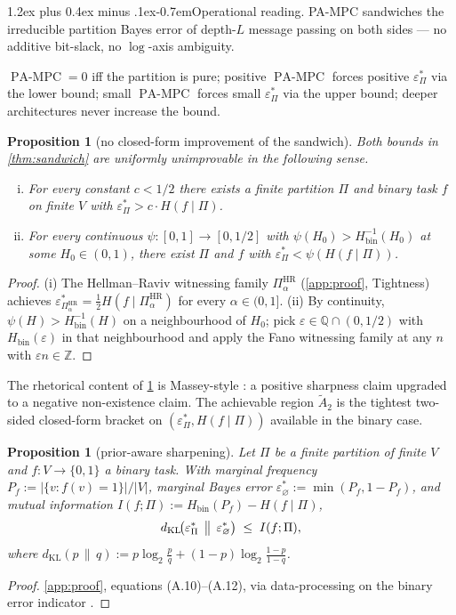 \documentclass[10pt]{article}
\makeatletter
\def\paragraph{\@startsection{paragraph}{4}{\z@}%
  {1.2ex plus 0.4ex minus .1ex}{-0.7em}{\normalsize\bf}}
\newtheorem{proposition}[theorem]{Proposition}
\theoremstyle{definition}
\theoremstyle{remark}
\newcommand{\Hbin}{H_{\mathrm{bin}}}
\newcommand{\eps}{\varepsilon}
\newcommand{\epsP}{\eps^{*}_{\Pi}}
\newcommand{\epsE}{\eps^{*}_{\varnothing}}
\newcommand{\PAMPC}{\operatorname{PA\text{-}MPC}}
\newcommand{\dKL}{d_{\mathrm{KL}}}
\makeatother
\begin{document}
\paragraph{Operational reading.}
PA-MPC sandwiches the irreducible partition Bayes error of depth-$L$
message passing on both sides --- no additive bit-slack, no
$\log$-axis ambiguity.

$\PAMPC = 0$ iff the partition is pure; positive $\PAMPC$ forces
positive $\epsP$ via the lower bound; small $\PAMPC$ forces small
$\epsP$ via the upper bound; deeper architectures never increase the
bound.

\begin{proposition}[no closed-form improvement of the sandwich]\label{prop:sharp}
Both bounds in \cref{thm:sandwich} are uniformly unimprovable in the
following sense.
\begin{enumerate}[(i)]
  \item For every constant $c < 1/2$ there exists a finite partition
    $\Pi$ and binary task $f$ on finite $V$ with
    $\epsP > c \cdot H(f \mid \Pi)$.
  \item For every \emph{continuous} $\psi : [0,1] \to [0, 1/2]$
    with $\psi(H_0) > \Hbin^{-1}(H_0)$ at some $H_0 \in (0, 1)$,
    there exist $\Pi$ and $f$ with $\epsP < \psi(H(f \mid \Pi))$.
\end{enumerate}
\end{proposition}
\begin{proof}
(i) The Hellman--Raviv witnessing family $\Pi_\alpha^{\mathrm{HR}}$
(\cref{app:proof}, Tightness) achieves
$\eps^{*}_{\Pi_\alpha^{\mathrm{HR}}} = \tfrac{1}{2} H(f \mid \Pi_\alpha^{\mathrm{HR}})$
for every $\alpha \in (0,1]$.
(ii) By continuity, $\psi(H) > \Hbin^{-1}(H)$ on a neighbourhood of
$H_0$; pick $\eps \in \mathbb{Q} \cap (0, 1/2)$ with $\Hbin(\eps)$ in
that neighbourhood and apply the Fano witnessing family at any $n$
with $\eps n \in \mathbb{Z}$.
\end{proof}

The rhetorical content of \cref{prop:sharp} is
Massey-style \citep[\S III]{massey1994}: a positive sharpness claim
upgraded to a negative non-existence claim. The achievable region
$\widetilde{A}_2$ is the tightest two-sided closed-form bracket on
$(\epsP, H(f \mid \Pi))$ available in the binary case.

\begin{proposition}[prior-aware sharpening]\label{prop:prior}
Let $\Pi$ be a finite partition of finite $V$ and $f : V \to \{0,1\}$
a binary task. With marginal frequency
$P_f := |\{v : f(v) = 1\}| / |V|$, marginal Bayes error
$\epsE := \min(P_f, 1 - P_f)$, and mutual information
$I(f ; \Pi) := \Hbin(P_f) - H(f \mid \Pi)$,
\[
  \dKL\!\bigl(\epsP \,\bigm\|\, \epsE\bigr) \;\le\; I(f ; \Pi),
\]
where $\dKL(p \,\|\, q) := p \log_2 \tfrac{p}{q} + (1-p) \log_2 \tfrac{1-p}{1-q}$.
\end{proposition}
\begin{proof}
\cref{app:proof}, equations (A.10)--(A.12), via
data-processing on the binary error indicator \citep{hanverdu1994}.
\end{proof}
\end{document}
